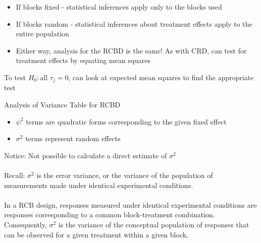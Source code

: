 \newpage

\begin{itemize}
        \item{If blocks fixed - statistical inferences apply only to the blocks used}
        \item{If blocks random - statistical inferences about treatment effects apply to the entire population}
        \item{Either way, analysis for the RCBD is the same!  As with CRD, can test for treatment effects by equating mean squares}\\
\end{itemize}
To test $H_{0}: \text{all } \tau_{j}=0$, can look at expected mean squares to find the appropriate test
	
\begin{center}Analysis of Variance Table for RCBD\end{center}
    \begin{itemize}
    	\item{$\psi^2$ terms are quadratic forms corresponding to the given fixed effect}
    	\item{$\sigma^2$ terms represent random effects}
    \end{itemize}
		
Notice:  Not possible to calculate a direct estimate of $\sigma^2$\\~\\
Recall: $\sigma^2$ is the error variance, or the variance of the population of measurements made under identical experimental conditions.\\~\\

In a RCB design, responses measured under identical experimental conditions are responses corresponding to a common block-treatment combination.  Consequently, $\sigma^2$ is the variance of the conceptual population of responses that can be observed for a given treatment within a given block.\\~\\


